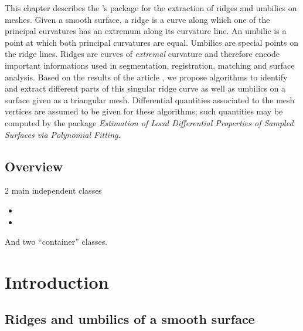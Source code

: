 





\newtheorem{definition}{Definition.}
\newcommand{\hot}{h.o.t}%


This chapter describes the \cgal's package for the extraction of
ridges and umbilics on meshes.  Given a smooth surface, a ridge is a
curve along which one of the principal curvatures has an extremum
along its curvature line. An umbilic is a point at which both
principal curvatures are equal. Umbilics are special points on the
ridge lines. Ridges are curves of {\em extremal} curvature and
therefore encode important informations used in segmentation,
registration, matching and surface analysis.  Based on the results of
the article
\cite{cgal:cp-tdare-05}
, we propose algorithms to identify and extract
different parts of this singular ridge curve as well as umbilics on a
surface given as a triangular mesh. Differential quantities associated
to the mesh vertices are assumed to be given for these algorithms;
such quantities may be computed by the package {\em Estimation of
Local Differential Properties of Sampled Surfaces via Polynomial
Fitting}.


\subsection{Overview}

2 main independent classes

\begin{itemize}
\item
{}
\item
{}
\end{itemize}

And two ``container'' classes.

\section{Introduction}
\label{sec:intro}

\subsection{Ridges and umbilics of a smooth surface}

